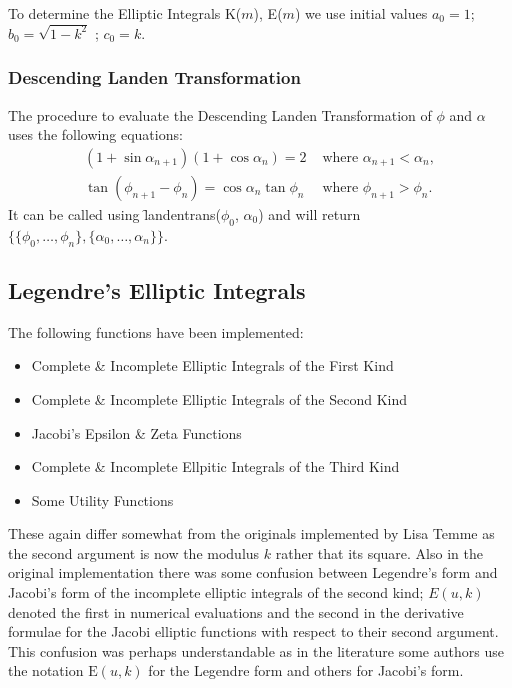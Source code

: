 To determine the Elliptic Integrals K($m$), E($m$) we use initial values
\(a_0 = 1\); \(b_0 = \sqrt{1-k^2}\) ; \(c_0 = k\).

\subsubsection{Descending Landen Transformation}
The procedure to evaluate the Descending Landen Transformation of
$\phi$ and $\alpha$ uses the following equations:
\begin{align*}
 (1+\sin \alpha_{n+1})(1+\cos \alpha_n)=2 &\text{ where } \alpha_{n+1}<\alpha_n, \\
  \tan(\phi_{n+1}-\phi_n)=\cos \alpha_n \tan \phi_n & \text{ where } \phi_{n+1}>\phi_n.
\end{align*}
It can be called using \f{landentrans}($\phi_0$, $\alpha_0$)
and will return \\
$\{\{\phi_0, \ldots ,\phi_n\},\{\alpha_0, \ldots ,\alpha_n\}\}$.

\subsection{Legendre's Elliptic Integrals}
\hypertarget{ELLIPI}{}
The following functions have been implemented:

\begin{itemize}
\item Complete \& Incomplete Elliptic Integrals of the First Kind
\item Complete \& Incomplete Elliptic Integrals of the Second Kind
\item Jacobi's Epsilon \& Zeta Functions
\item Complete \& Incomplete Ellpitic Integrals of the Third Kind
\item Some Utility Functions  
\end{itemize}

These again differ somewhat from the originals implemented by Lisa Temme
as the second argument is now the modulus $k$ rather that its square.
Also in the original implementation  there was some confusion between
Legendre's form and Jacobi's form of the incomplete elliptic integrals of
the second kind; $E(u,k)$ denoted the first in numerical
evaluations and the second in the derivative formulae for the Jacobi
elliptic functions with respect to their second argument.
This confusion was perhaps understandable
as in the literature some authors use the notation $\mathrm{E}(u, k)$ for
the Legendre form and others for Jacobi's form.

